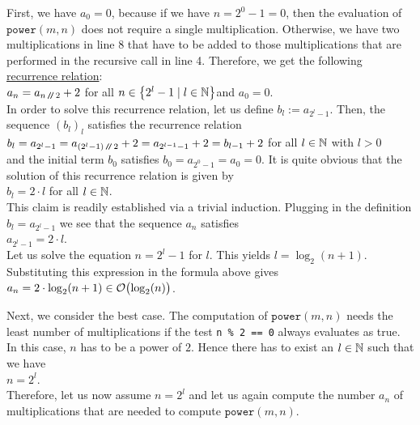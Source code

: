 First, we have $a_0 = 0$, because if we have $n = 2^0 - 1 = 0$, then the evaluation of 
$\mathtt{power}(m, n)$ does not require a single multiplication.
Otherwise, we have two multiplications in line 8 that have to be added to those multiplications
that are performed in the recursive call in line 4.  Therefore, we get the following
\href{http://en.wikipedia.org/wiki/Recurrence_relation}{recurrence relation}:
\\[0.2cm]
\hspace*{1.3cm}
$a_n = a_{n \mbox{\scriptsize\,\texttt{/}$\!$\texttt{/}\,} 2} + 2$ \qquad for all $n \in \left\{2^l - 1 \mid l \in {\mathbb N}\right\}$\quad and $a_0 = 0$. 
\\[0.2cm]
In order to solve this recurrence relation, let us define $b_l := a_{2^l-1}$.  Then, the sequence
$(b_l)_l$ 
satisfies the recurrence relation
 \\[0.2cm]
\hspace*{1.3cm} 
$b_l = a_{2^l-1} = a_{(2^l-1) \mbox{\scriptsize\,\texttt{/}$\!$\texttt{/}\,} 2} + 2 = a_{2^{l-1}-1} + 2 = b_{l-1} +2$ \qquad for all $l\in{\mathbb N}$ with
$l > 0$
\\[0.2cm]
and the initial term $b_0$ satisfies $b_0 = a_{2^0-1} = a_0 = 0$.  It is quite obvious that the
solution of this recurrence relation is given by
\\[0.2cm]
\hspace*{1.3cm} $b_l = 2 \cdot l$ \qquad for all $l \in {\mathbb N}$. 
\\[0.2cm] 
This claim is readily established via a trivial induction.  Plugging in the definition $b_l = a_{2^l-1}$ we
see that the sequence $a_n$ satisfies \\[0.2cm]
\hspace*{1.3cm} $a_{2^l-1} = 2 \cdot l$. 
\\[0.2cm]
Let us solve the equation $n = 2^l - 1$ for $l$.  This yields
 $l =
\log_2(n+1)$.  Substituting this expression in the formula above gives \\[0.2cm]
\hspace*{1.3cm} $a_n = 2 \cdot \log_2(n+1) \in \mathcal{O}\bigl(\log_2(n)\bigr)$.
\vspace*{0.3cm}

Next, we consider the best case.  The computation of
$\mathtt{power}(m,n)$ needs the least number of multiplications if the test 
\texttt{n \% 2 == 0}
always evaluates as true.  In this case, $n$ has to be a power of $2$.  
Hence there has to exist an $l\in {\mathbb N}$ such that we have
 \\[0.2cm]
\hspace*{1.3cm} $n = 2^l$.
 \\[0.2cm]
Therefore, let us now assume $n = 2^l$ and let us again compute the number $a_n$ of multiplications
that are needed to compute $\mathtt{power}(m,n)$. 

